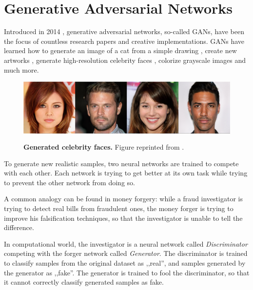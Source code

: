 \documentclass[12pt]{report}
\begin{document}
\section{Generative Adversarial Networks}

Introduced in 2014 \cite{goodfellow_generative_2014}, generative adversarial  networks, so-called GANs, have been the focus of countless research papers and creative implementations. GANs have learned how to generate an image of a cat from a simple drawing \cite{hesse_image--image_nodate}, create new artworks \cite{rkjones4_gangogh_2018}, generate high-resolution celebrity faces \cite{karras_progressive_2017}, colorize grayscale images and much more.

\begin{figure}[b]
\centering
{\includegraphics[width=\linewidth]{02_background/gan_faces}}
\caption{\label{fig:celebrity} \textbf{Generated celebrity faces.} Figure reprinted from \cite{karras_progressive_2017}.}
\end{figure}

To generate new realistic samples, two neural networks are trained to compete with each other. Each network is trying to get better at its own task while trying to prevent the other network from doing so. 

A common analogy can be found in money forgery: while a fraud investigator is trying to detect real bills from fraudulent ones, the money forger is trying to improve his falsification techniques, so that the investigator is unable to tell the difference.

In computational world, the investigator is a neural network called \textit{Discriminator} competing with the forger network called \textit{Generator}. The discriminator is trained to classify samples from the original dataset as ,,real'', and samples generated by the generator as ,,fake''. The generator is trained to fool the discriminator, so that it cannot correctly classify generated samples as fake.
\end{document}
